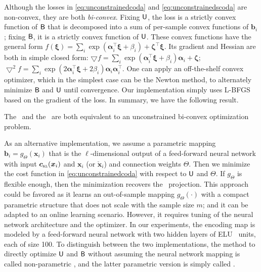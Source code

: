 \documentclass{article}
\begin{document}
Although the losses in \eqref{eq:unconstrainedcoda} and \eqref{eq:unconstrainedscoda}
are non-convex, they are both \emph{bi-convex}.
Fixing $\mathsf{U}$, the loss is a strictly
convex function of $\mathsf{B}$ that is decomposed into a sum of
per-sample convex functions of $\bm{b}_i$; fixing $\mathsf{B}$, it is a strictly convex
function of $\mathsf{U}$. These convex functions have the general form
$f(\bm\xi)=\sum_i \exp(\bm\alpha_i^\top\bm\xi+\beta_i) + \bm\zeta^\top\bm\xi$.
Its gradient and Hessian are both in simple closed form:
$\bigtriangledown{f}
=\sum_i\exp(\bm\alpha_i^\top \bm\xi+\beta_i)\bm\alpha_i + \bm\zeta$;
$\bigtriangledown^2{f}
=\sum_i\exp(2\bm\alpha_i^\top \bm\xi+2\beta_i)\bm\alpha_i\bm\alpha_i^\top$.
One can apply an off-the-shelf convex optimizer, which in the simplest case can be the Newton method,
to alternately minimize $\mathsf{B}$ and $\mathsf{U}$ until convergence.
Our implementation simply uses L-BFGS~\cite{bvCO} based on the gradient of the loss.
In summary, we have the following result.
\begin{proposition}
The \CoDAPCA~and the \surrogateCoDAPCA~are both equivalent to an unconstrained bi-convex optimization problem.
\end{proposition}


As an alternative implementation, we assume a parametric mapping
$\bm{b}_i = g_\Theta(\bm{x}_i)$ that is the $\ell$-dimensional output
of a feed-forward neural network with input $\clrlog(\bm{x}_i)$ and $\bm{x}_i$ (or $\check{\bm{x}}_i$)
and connection weights $\Theta$.
Then we minimize the cost function in \eqref{eq:unconstrainedcoda} with respect to $\mathsf{U}$ and $\Theta$.
If $g_{\Theta}$ is flexible enough, then the minimization recovers the \CoDAPCA~projection.
This approach could be favored as
 it learns an out-of-sample mapping $g_\Theta(\cdot)$
with a compact parametric structure that does not scale with the sample size $m$; and
 it can be adapted to an online learning scenario.
However, it requires tuning of the neural network architecture and the optimizer.
In our experiments, the encoding map is modeled by a feed-forward neural network with two hidden
layers of ELU~\cite{cuhFA} units, each of size 100.
To distinguish between the two implementations, the method to directly optimize
$\mathsf{U}$ and $\mathsf{B}$ without assuming the neural network mapping is called non-parametric \CoDAPCA,
and the latter parametric version is simply called \CoDAPCA.
\end{document}
